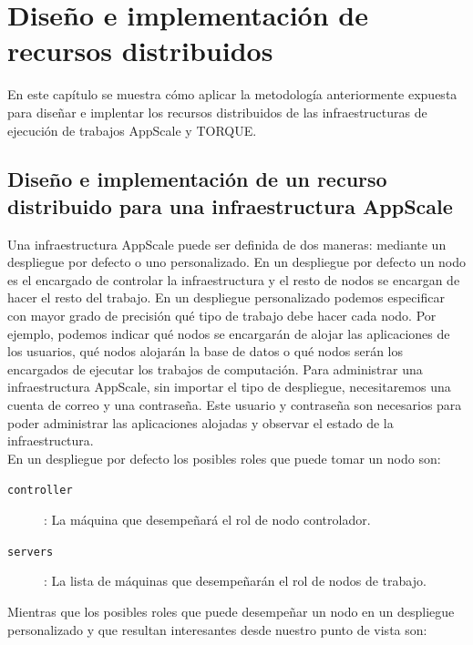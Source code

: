 \chapter{Diseño e implementación de recursos distribuidos}
\label{cap:disenyo}


En este capítulo se muestra cómo aplicar la metodología anteriormente expuesta para diseñar e implentar los recursos distribuidos de las infraestructuras de ejecución de trabajos AppScale y TORQUE.

\section{Diseño e implementación de un recurso distribuido para una infraestructura AppScale}

Una infraestructura AppScale puede ser definida de dos maneras: mediante un despliegue por defecto o uno personalizado. En un despliegue por defecto un nodo es el encargado de controlar la infraestructura y el resto de nodos se encargan de hacer el resto del trabajo. En un despliegue personalizado podemos especificar con mayor grado de precisión qué tipo de trabajo debe hacer cada nodo. Por ejemplo, podemos indicar qué nodos se encargarán de alojar las aplicaciones de los usuarios, qué nodos alojarán la base de datos o qué nodos serán los encargados de ejecutar los trabajos de computación. Para administrar una infraestructura AppScale, sin importar el tipo de despliegue, necesitaremos una cuenta de correo y una contraseña. Este usuario y contraseña son necesarios para poder administrar las aplicaciones alojadas y observar el estado de la infraestructura. \\

En un despliegue por defecto los posibles roles que puede tomar un nodo son:

\begin{description}
\item[\texttt{controller}]: La máquina que desempeñará el rol de nodo controlador.
\item[\texttt{servers}]: La lista de máquinas que desempeñarán el rol de nodos de trabajo.
\end{description}

Mientras que los posibles roles que puede desempeñar un nodo en un despliegue personalizado y que resultan interesantes desde nuestro punto de vista son:

